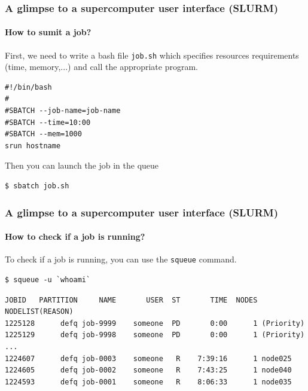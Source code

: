 \documentclass[11pt,compress,serif]{beamer}
\begin{document}
\begin{frame}[fragile=singleslide]
\frametitle{A glimpse to a supercomputer user interface (SLURM)}
\framesubtitle{How to sumit a job?}

First, we need to write a bash file \texttt{job.sh} which specifies 
resources requirements (time, memory,...) 
and call the appropriate program.

\begin{verbatim}
#!/bin/bash
#
#SBATCH --job-name=job-name
#SBATCH --time=10:00
#SBATCH --mem=1000
srun hostname
\end{verbatim}

Then you can launch the job in the queue
\begin{verbatim}
$ sbatch job.sh
\end{verbatim}
\end{frame}

\begin{frame}[fragile=singleslide]
\frametitle{A glimpse to a supercomputer user interface (SLURM)}
\framesubtitle{How to check if a job is running?}

To check if a job is running, you can use the \texttt{squeue} command.

\begin{verbatim}
$ squeue -u `whoami`
\end{verbatim}

\begin{scriptsize}
\begin{verbatim}
JOBID   PARTITION     NAME       USER  ST       TIME  NODES NODELIST(REASON)
1225128      defq job-9999    someone  PD       0:00      1 (Priority)
1225129      defq job-9998    someone  PD       0:00      1 (Priority)
...
1224607      defq job-0003    someone   R    7:39:16      1 node025
1224605      defq job-0002    someone   R    7:43:25      1 node040
1224593      defq job-0001    someone   R    8:06:33      1 node035
\end{verbatim}
\end{scriptsize}



\end{frame}


\end{document}
